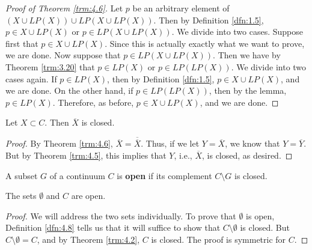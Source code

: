 \documentclass[../main.tex]{subfiles}
\begin{document}
\begin{theorem}
\begin{proof}[Proof of Theorem \ref{trm:4.6}]
        Let $p$ be an arbitrary element of $(X\cup LP(X))\cup LP(X\cup LP(X))$. Then by Definition \ref{dfn:1.5}, $p\in X\cup LP(X)$ or $p\in LP(X\cup LP(X))$. We divide into two cases. Suppose first that $p\in X\cup LP(X)$. Since this is actually exactly what we want to prove, we are done. Now suppose that $p\in LP(X\cup LP(X))$. Then we have by Theorem \ref{trm:3.20} that $p\in LP(X)$ or $p\in LP(LP(X))$. We divide into two cases again. If $p\in LP(X)$, then by Definition \ref{dfn:1.5}, $p\in X\cup LP(X)$, and we are done. On the other hand, if $p\in LP(LP(X))$, then by the lemma, $p\in LP(X)$. Therefore, as before, $p\in X\cup LP(X)$, and we are done.
    \end{proof}
\end{theorem}

\begin{corollary}\label{cly:4.7}
    Let $X\subset C$. Then $\overline{X}$ is closed.
    \begin{proof}
        By Theorem \ref{trm:4.6}, $\overline{X}=\overline{\overline{X}}$. Thus, if we let $Y=\overline{X}$, we know that $Y=\overline{Y}$. But by Theorem \ref{trm:4.5}, this implies that $Y$, i.e., $\overline{X}$, is closed, as desired.
    \end{proof}
\end{corollary}

\begin{definition}\label{dfn:4.8}
    A subset $G$ of a continuum $C$ is \textbf{open} if its complement $C\setminus G$ is closed.
\end{definition}

\begin{theorem}\label{trm:4.9}
    The sets $\emptyset$ and $C$ are open.
    \begin{proof}
        We will address the two sets individually. To prove that $\emptyset$ is open, Definition \ref{dfn:4.8} tells us that it will suffice to show that $C\setminus\emptyset$ is closed. But $C\setminus\emptyset=C$, and by Theorem \ref{trm:4.2}, $C$ is closed. The proof is symmetric for $C$.
    \end{proof}
\end{theorem}
\end{document}
